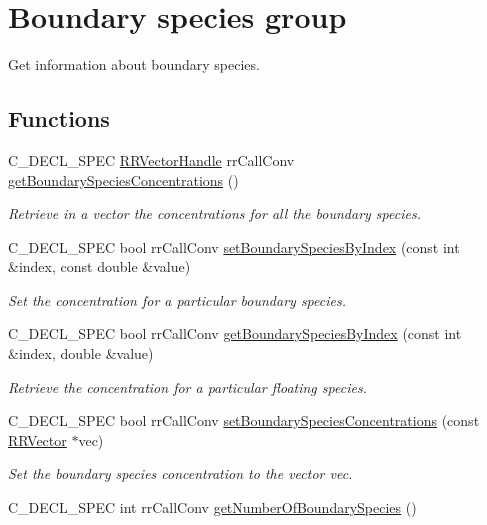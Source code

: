 \hypertarget{group__boundary}{
\section{\-Boundary species group}
\label{group__boundary}
}


\-Get information about boundary species.  


\subsection*{\-Functions}
\begin{DoxyCompactItemize}
\item 
\-C\-\_\-\-D\-E\-C\-L\-\_\-\-S\-P\-E\-C \hyperlink{rr__c__types_8h_aea46a16752b0ae2cd95c009030ee630e}{\-R\-R\-Vector\-Handle} \*
rr\-Call\-Conv \hyperlink{group__boundary_gaae9b6b75211923bcf6f7196fe707c631}{get\-Boundary\-Species\-Concentrations} ()
\begin{DoxyCompactList}\small\item\em \-Retrieve in a vector the concentrations for all the boundary species. \end{DoxyCompactList}\item 
\-C\-\_\-\-D\-E\-C\-L\-\_\-\-S\-P\-E\-C bool rr\-Call\-Conv \hyperlink{group__boundary_gabb6764fa48d0b3f2ca3b38e391479347}{set\-Boundary\-Species\-By\-Index} (const int \&index, const double \&value)
\begin{DoxyCompactList}\small\item\em \-Set the concentration for a particular boundary species. \end{DoxyCompactList}\item 
\-C\-\_\-\-D\-E\-C\-L\-\_\-\-S\-P\-E\-C bool rr\-Call\-Conv \hyperlink{group__boundary_gaad04359bcaa998547d71b4cdd337796e}{get\-Boundary\-Species\-By\-Index} (const int \&index, double \&value)
\begin{DoxyCompactList}\small\item\em \-Retrieve the concentration for a particular floating species. \end{DoxyCompactList}\item 
\-C\-\_\-\-D\-E\-C\-L\-\_\-\-S\-P\-E\-C bool rr\-Call\-Conv \hyperlink{group__boundary_ga161f8d9a48e36631d34d07c252bcc444}{set\-Boundary\-Species\-Concentrations} (const \hyperlink{struct_r_r_vector}{\-R\-R\-Vector} $\ast$vec)
\begin{DoxyCompactList}\small\item\em \-Set the boundary species concentration to the vector vec. \end{DoxyCompactList}\item 
\hypertarget{group__boundary_ga17c851dfb27b9697ff286cc57d4cd10d}{
\-C\-\_\-\-D\-E\-C\-L\-\_\-\-S\-P\-E\-C int rr\-Call\-Conv \hyperlink{group__boundary_ga17c851dfb27b9697ff286cc57d4cd10d}{get\-Number\-Of\-Boundary\-Species} ()}
\label{group__boundary_ga17c851dfb27b9697ff286cc57d4cd10d}


\end{DoxyCompactItemize}
